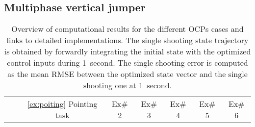 \subsection{Multiphase vertical jumper}\label{ex:jump}

%
\begin{table*}[h!]
\caption{\small Overview of computational results for the different OCPs cases and links to detailed implementations. The single shooting state trajectory is obtained by forwardly integrating the initial state with the optimized control inputs during 1~second. The single shooting error is computed as the mean RMSE between the optimized state vector and the single shooting one at 1~second.}
\label{tab:Perfs_and_detailed_implementations_of_each_example}
\centering
\begin{tabular}{c l rcl rcl rcl rcl rcl rcl}
\cmidrule[\heavyrulewidth](lr){2-20}
& & \multicolumn{3}{c}{\ref{ex:poiting} Pointing task} & \multicolumn{3}{c}{Ex\# 2} & \multicolumn{3}{c}{Ex\# 3} & \multicolumn{3}{c}{Ex\# 4} & \multicolumn{3}{c}{Ex\# 5} & \multicolumn{3}{c}{Ex\# 6}\\
\cmidrule[\heavyrulewidth](lr){3-5}
\cmidrule[\heavyrulewidth](lr){6-8}
\cmidrule[\heavyrulewidth](lr){9-11}
\cmidrule[\heavyrulewidth](lr){12-14}
\cmidrule[\heavyrulewidth](lr){15-17}
\cmidrule[\heavyrulewidth](lr){18-20}


\end{tabular}
\end{table*}
